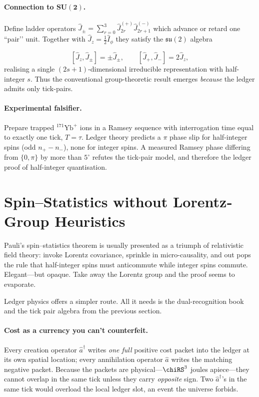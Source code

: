 \documentclass[11pt,oneside]{book}
\begin{document}
\paragraph{Connection to \(\mathbf{SU(2)}\).}
Define ladder operators
\(
  \hat J_{\pm} = \sum_{r=0}^{3}
  \hat J^{(+)}_{2r}\hat J^{(-)}_{2r+1}
\)
which advance or retard one “pair’’ unit.  
Together with
\(
  \hat J_{z} = \tfrac12\hat I_{\phi}
\)
they satisfy the \(\mathfrak{su}(2)\) algebra  

\[
 [\hat J_{z},\hat J_{\pm}] = \pm\hat J_{\pm},
 \qquad
 [\hat J_{+},\hat J_{-}] = 2\hat J_{z},
\]
realising a single \((2s+1)\)-dimensional irreducible representation
with half-integer \(s\).  
Thus the conventional group-theoretic result emerges \emph{because}
the ledger admits only tick-pairs.

\paragraph{Experimental falsifier.}
Prepare trapped \(^{171}\mathrm{Yb}^{+}\) ions in a Ramsey sequence
with interrogation time equal to exactly one tick,
\(T=\tau\).  
Ledger theory predicts a \(\pi\) phase slip for
half-integer spins (odd \(n_{+}-n_{-}\)), none for integer spins.  
A measured Ramsey phase differing from \(\{0,\pi\}\) by more than
\(5^{\circ}\) refutes the tick-pair model, and therefore the ledger
proof of half-integer quantisation.


\section{Spin–Statistics without Lorentz‐Group Heuristics}
\label{sec:spin-stat-narrative}

Pauli’s spin–statistics theorem is usually presented as a triumph of
relativistic field theory: invoke Lorentz covariance, sprinkle in
micro-causality, and out pops the rule that half-integer spins must
anticommute while integer spins commute.  
Elegant—but opaque.  
Take away the Lorentz group and the proof seems to evaporate.

Ledger physics offers a simpler route.  
All it needs is the dual-recognition book and the tick pair algebra
from the previous section.

\paragraph{Cost as a currency you can’t counterfeit.}
Every creation operator \(\hat a^{\dagger}\) writes \emph{one full}
positive cost packet into the ledger at its own spatial location;
every annihilation operator \(\hat a\) writes the matching negative
packet.  
Because the packets are physical—\(\chiRS^{3}\) joules apiece—they
cannot overlap in the same tick unless they carry \emph{opposite}
sign.  
Two \(\hat a^{\dagger}\)’s in the same tick would overload the local
ledger slot, an event the universe forbids.
\end{document}
